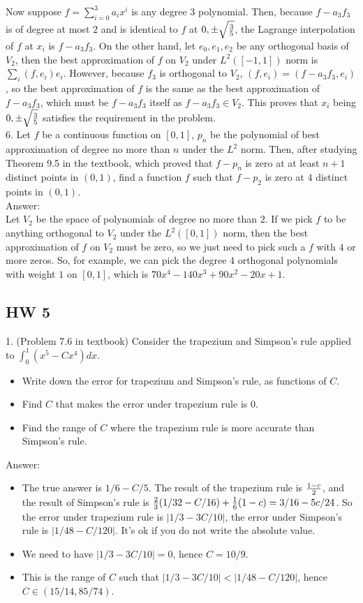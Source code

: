 \documentclass{article} %
\theoremstyle{break}
\begin{document}
Now suppose $f=\sum_{i=0}^3a_ix^i$ is any degree $3$ polynomial. Then, because $f-a_3f_3$ is of degree at most $2$ and is identical to $f$ at $0, \pm\sqrt{3\over 5}$, the Lagrange interpolation of $f$ at $x_i$ is $f-a_3f_3$. On the other hand, let $e_0, e_1, e_2$ be any orthogonal basis of $V_2$, then the best approximation of $f$ on $V_2$ under $L^2([-1, 1])$ norm is $\sum_i(f, e_i)e_i$. However, because $f_3$ is orthogonal to $V_2$, $(f, e_i)=(f-a_3f_3, e_i)$, so the best approximation of $f$ is the same as the best approximation of $f-a_3f_3$, which must be $f-a_3f_3$ itself as $f-a_3f_3\in V_2$. This proves that $x_i$ being $0, \pm\sqrt{3\over 5}$ satisfies the requirement in the problem.\\


6. Let $f$ be a continuous function on $[0, 1]$, $p_n$ be the polynomial of best approximation of degree no more than $n$ under the $L^2$ norm. Then, after studying Theorem 9.5 in the textbook, which proved that $f-p_n$ is zero at at least $n+1$ distinct points in $(0, 1)$, find a function $f$ such that $f-p_2$ is zero at $4$ distinct points in $(0, 1)$.\\

Answer:\\

Let $V_2$ be the space of polynomials of degree no more than $2$. If we pick $f$ to be anything orthogonal to $V_2$ under the $L^2([0, 1])$ norm, then the best approximation of $f$ on $V_2$ must be zero, so we just need to pick such a $f$ with $4$ or more zeros. So, for example, we can pick the degree $4$ orthogonal polynomials with weight $1$ on $[0, 1]$, which is $70x^4-140x^3+90x^2-20x+1$.

\subsection{HW 5}

1. (Problem 7.6 in textbook) Consider the trapezium and Simpson's rule applied to $\int_0^1(x^5-Cx^4)dx$.
\begin{itemize}
\item Write down the error for trapezium and Simpson's rule, as functions of $C$.
\item Find $C$ that makes the error under trapezium rule is $0$.
\item Find the range of $C$ where the trapezium rule is more accurate than Simpson's rule.
\end{itemize}

Answer:
\begin{itemize}
\item The true answer is $1/6-C/5$. The result of the trapezium rule is ${1-c\over 2}$, and the result of Simpson's rule is ${2\over 3}(1/32-C/16)+{1\over 6}(1-c)=3/16-{5c/24}$. So the error under trapezium rule is $|1/3-3C/10|$, the error under Simpson's rule is $|1/48-C/120|$. It's ok if you do not write the absolute value.
\item We need to have $|1/3-3C/10|=0$, hence $C=10/9$.
\item This is the range of $C$ such that $|1/3-3C/10|<|1/48-C/120|$, hence $C\in (15/14, 85/74)$.
\end{itemize}
\end{document}

